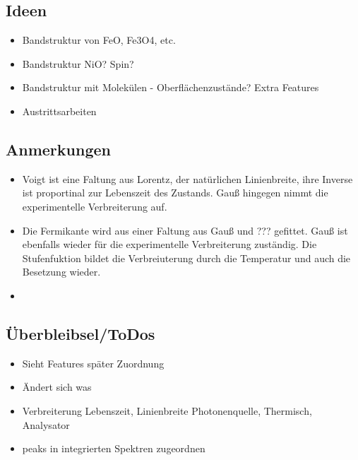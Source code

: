     \subsection{Ideen}
    \begin{itemize}
        \item Bandstruktur von FeO, Fe3O4, etc.
        \item Bandstruktur NiO? Spin?
        \item Bandstruktur mit Molekülen - Oberflächenzustände? Extra Features
        \item Austrittsarbeiten
    \end{itemize}

    \subsection{Anmerkungen}
    \begin{itemize}
        \item Voigt ist eine Faltung aus Lorentz, der natürlichen Linienbreite, ihre Inverse ist proportinal zur Lebenszeit des Zustands. Gauß hingegen nimmt die experimentelle Verbreiterung auf.
        \item Die Fermikante wird aus einer Faltung aus Gauß und ??? gefittet. Gauß ist ebenfalls wieder für die experimentelle Verbreiterung zuständig. Die Stufenfuktion bildet die Verbreiuterung durch die Temperatur und auch die Besetzung wieder.
        \item 
    \end{itemize}

    \subsection{Überbleibsel/ToDos}
    \begin{itemize}
        \item Sieht Features später Zuordnung
        \item Ändert sich was
        \item Verbreiterung Lebenszeit, Linienbreite Photonenquelle, Thermisch, Analysator
        \item peaks in integrierten Spektren zugeordnen
    \end{itemize}

